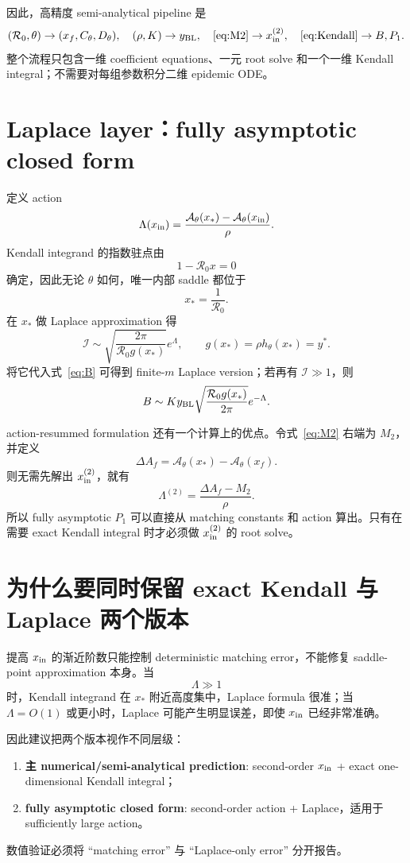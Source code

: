 \documentclass[11pt,a4paper]{ctexart}
\newcommand{\Rzero}{\mathcal R_0}
\newcommand{\Afun}{\mathcal A_\theta}
\newcommand{\BL}{y_{\rm BL}}
\newcommand{\xin}{x_{\rm in}}
\newcommand{\xf}{x_f}
\newcommand{\xs}{x_*}
\newcommand{\Pone}{P_1}
\begin{document}
因此，高精度 semi-analytical pipeline 是
\[
(\Rzero,\theta)\to(\xf,C_\theta,D_\theta),
\quad
(\rho,K)\to\BL,
\quad
\eqref{eq:M2}\to x_{\rm in}^{(2)},
\quad
\eqref{eq:Kendall}\to B,\Pone.
\]
整个流程只包含一维 coefficient equations、一元 root solve 和一个一维 Kendall integral；不需要对每组参数积分二维 epidemic ODE。

\section{Laplace layer：fully asymptotic closed form}
定义 action
\begin{equation}
\label{eq:Lambda}
\Lambda(\xin)
=\frac{\Afun(\xs)-\Afun(\xin)}{\rho}.
\end{equation}
Kendall integrand 的指数驻点由
\[
1-\Rzero x=0
\]
确定，因此无论 $\theta$ 如何，唯一内部 saddle 都位于
\[
\xs=\frac1{\Rzero}.
\]
在 $\xs$ 做 Laplace approximation 得
\begin{equation}
\label{eq:Ilap}
\mathcal I
\sim
\sqrt{\frac{2\pi}{\Rzero g(\xs)}}e^\Lambda,
\qquad
g(\xs)=\rho h_\theta(\xs)=y^*.
\end{equation}
将它代入式~\eqref{eq:B} 可得到 finite-$m$ Laplace version；若再有 $\mathcal I\gg1$，则
\begin{equation}
\label{eq:Blap}
B
\sim
K\BL
\sqrt{\frac{\Rzero g(\xs)}{2\pi}}
e^{-\Lambda}.
\end{equation}

action-resummed formulation 还有一个计算上的优点。令式~\eqref{eq:M2} 右端为 $M_2$，并定义
\[
\Delta A_f=\Afun(\xs)-\Afun(\xf).
\]
则无需先解出 $x_{\rm in}^{(2)}$，就有
\begin{equation}
\label{eq:LambdaM2}
\Lambda^{(2)}
=\frac{\Delta A_f-M_2}{\rho}.
\end{equation}
所以 fully asymptotic $P_1$ 可以直接从 matching constants 和 action 算出。只有在需要 exact Kendall integral 时才必须做 $x_{\rm in}^{(2)}$ 的 root solve。

\section{为什么要同时保留 exact Kendall 与 Laplace 两个版本}
提高 $x_{\rm in}$ 的渐近阶数只能控制 deterministic matching error，不能修复 saddle-point approximation 本身。当
\[
\Lambda\gg1
\]
时，Kendall integrand 在 $x_*$ 附近高度集中，Laplace formula 很准；当 $\Lambda=O(1)$ 或更小时，Laplace 可能产生明显误差，即使 $x_{\rm in}$ 已经非常准确。

因此建议把两个版本视作不同层级：
\begin{enumerate}[leftmargin=2.2em]
\item \textbf{主 numerical/semi-analytical prediction}: second-order $x_{\rm in}$ + exact one-dimensional Kendall integral；
\item \textbf{fully asymptotic closed form}: second-order action + Laplace，适用于 sufficiently large action。
\end{enumerate}
数值验证必须将 ``matching error'' 与 ``Laplace-only error'' 分开报告。
\end{document}

